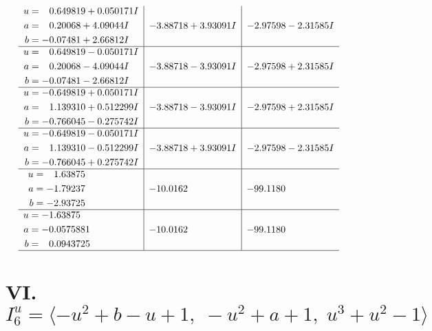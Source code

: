 \documentclass[1p]{elsarticle_modified}
\theoremstyle{definition}
\begin{document}
$$\begin{array}{c|c|c}
\begin{aligned}
u &= \phantom{-}0.649819 + 0.050171 I \\
a &= \phantom{-}0.20068 + 4.09044 I \\
b &= -0.07481 + 2.66812 I\end{aligned}
 & -3.88718 + 3.93091 I & -2.97598 - 2.31585 I \\ \hline\begin{aligned}
u &= \phantom{-}0.649819 - 0.050171 I \\
a &= \phantom{-}0.20068 - 4.09044 I \\
b &= -0.07481 - 2.66812 I\end{aligned}
 & -3.88718 - 3.93091 I & -2.97598 + 2.31585 I \\ \hline\begin{aligned}
u &= -0.649819 + 0.050171 I \\
a &= \phantom{-}1.139310 + 0.512299 I \\
b &= -0.766045 - 0.275742 I\end{aligned}
 & -3.88718 - 3.93091 I & -2.97598 + 2.31585 I \\ \hline\begin{aligned}
u &= -0.649819 - 0.050171 I \\
a &= \phantom{-}1.139310 - 0.512299 I \\
b &= -0.766045 + 0.275742 I\end{aligned}
 & -3.88718 + 3.93091 I & -2.97598 - 2.31585 I \\ \hline\begin{aligned}
u &= \phantom{-}1.63875\phantom{ +0.000000I} \\
a &= -1.79237\phantom{ +0.000000I} \\
b &= -2.93725\phantom{ +0.000000I}\end{aligned}
 & -10.0162\phantom{ +0.000000I} & -99.1180\phantom{ +0.000000I} \\ \hline\begin{aligned}
u &= -1.63875\phantom{ +0.000000I} \\
a &= -0.0575881\phantom{ +0.000000I} \\
b &= \phantom{-}0.0943725\phantom{ +0.000000I}\end{aligned}
 & -10.0162\phantom{ +0.000000I} & -99.1180\phantom{ +0.000000I}\\
 \hline 
 \end{array}$$\newpage\newpage\renewcommand{\arraystretch}{1}
\centering \section*{VI. $I^u_{6}= \langle - u^2+b- u+1,\;- u^2+a+1,\;u^3+u^2-1 \rangle$}
\end{document}

